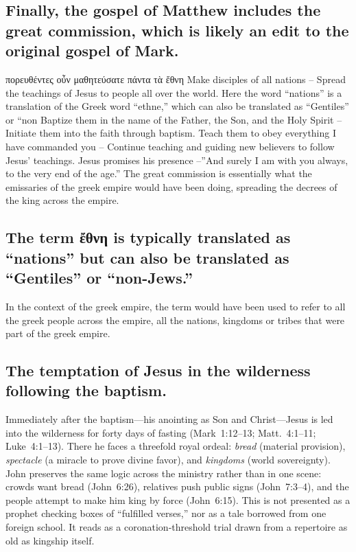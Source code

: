 \subsection{Finally, the gospel of Matthew includes the great commission, which is likely an edit to the original gospel of Mark.}\label{subsec:finally-the-gospel-of-matthew-includes-the-great-commission-which-is-likely-an-edit-to-the-original-gospel-of-mark.}

πορευθέντες οὖν μαθητεύσατε πάντα τὰ ἔθνη Make disciples of all nations -- Spread the teachings of Jesus to people all over the world.
Here the word ``nations'' is a translation of the Greek word ``ethne,'' which can also be translated as ``Gentiles'' or ``non Baptize them in the name of the Father, the Son, and the Holy Spirit -- Initiate them into the faith through baptism.
Teach them to obey everything I have commanded you -- Continue teaching and guiding new believers to follow Jesus' teachings.
Jesus promises his presence --''And surely I am with you always, to the very end of the age.'' The great commission is essentially what the emissaries of the greek empire would have been doing, spreading the decrees of the king across the empire.

\subsection{The term ἔθνη is typically translated as ``nations'' but can also be translated as ``Gentiles'' or ``non-Jews.''}\label{subsec:the-term-ux1f14ux3b8ux3bdux3b7-is-typically-translated-as-nations-but-can-also-be-translated-as-gentiles-or-non-jews.}

In the context of the greek empire, the term would have been used to refer to all the greek people across the empire, all the nations, kingdoms or tribes that were part of the greek empire.

\subsection{The temptation of Jesus in the wilderness following the baptism.}\label{subsec:the-temptation-of-jesus-in-the-wilderness-following-the-baptism.}

Immediately after the baptism---his anointing as Son and Christ---Jesus is led into the wilderness for forty days of fasting (Mark~1:12--13; Matt.~4:1--11; Luke~4:1--13).
There he faces a threefold royal ordeal: \emph{bread} (material provision), \emph{spectacle} (a miracle to prove divine favor), and \emph{kingdoms} (world sovereignty).
John preserves the same logic across the ministry rather than in one scene: crowds want bread (John~6:26), relatives push public signs (John~7:3--4), and the people attempt to make him king by force (John~6:15).
This is not presented as a prophet checking boxes of “fulfilled verses,” nor as a tale borrowed from one foreign school.
It reads as a coronation‐threshold trial drawn from a repertoire as old as kingship itself.

